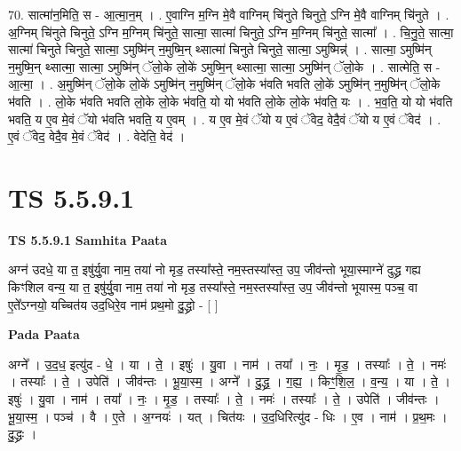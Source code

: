 \documentclass[17pt]{extarticle}
\begin{document}
70. सात्मा॑न॒मिति॒ स - आ॒त्मा॒न॒म् । . ए॒वाग्नि म॒ग्नि मे॒वै वाग्निम् चि॑नुते चिनुते॒ ऽग्नि मे॒वै वाग्निम् चि॑नुते । . अ॒ग्निम् चि॑नुते चिनुते॒ ऽग्नि म॒ग्निम् चि॑नुते॒ सात्मा॒ सात्मा॑ चिनुते॒ ऽग्नि म॒ग्निम् चि॑नुते॒ सात्मा᳚ । . चि॒नु॒ते॒ सात्मा॒ सात्मा॑ चिनुते चिनुते॒ सात्मा॒ ऽमुष्मि॑न् न॒मुष्मि॒न् थ्सात्मा॑ चिनुते चिनुते॒ सात्मा॒ ऽमुष्मिन्न्॑ । . सात्मा॒ ऽमुष्मि॑न् न॒मुष्मि॒न् थ्सात्मा॒ सात्मा॒ ऽमुष्मि॑न् ॅलो॒के लो॒के॑ ऽमुष्मि॒न् थ्सात्मा॒ सात्मा॒ ऽमुष्मि॑न् ॅलो॒के । . सात्मेति॒ स - आ॒त्मा॒ । . अ॒मुष्मि॑न् ॅलो॒के लो॒के॑ ऽमुष्मि॑न् न॒मुष्मि॑न् ॅलो॒के भ॑वति भवति लो॒के॑ ऽमुष्मि॑न् न॒मुष्मि॑न् ॅलो॒के भ॑वति । . लो॒के भ॑वति भवति लो॒के लो॒के भ॑वति॒ यो यो भ॑वति लो॒के लो॒के भ॑वति॒ यः । . भ॒व॒ति॒ यो यो भ॑वति भवति॒ य ए॒व मे॒वं ॅयो भ॑वति भवति॒ य ए॒वम् । . य ए॒व मे॒वं ॅयो य ए॒वं ॅवेद॒ वेदै॒वं ॅयो य ए॒वं ॅवेद॑ । . ए॒वं ॅवेद॒ वेदै॒व मे॒वं ॅवेद॑ । . वेदेति॒ वेद॑ । \newline
\pagebreak
{}

\section{ TS 5.5.9.1 }

\textbf{TS 5.5.9.1 } \newline
\textbf{Samhita Paata} \newline

अग्न॑ उदधे॒ या त॒ इषु॑र्यु॒वा नाम॒ तया॑ नो मृड॒ तस्या᳚स्ते॒ नम॒स्तस्या᳚स्त॒ उप॒ जीव॑न्तो भूया॒स्माग्ने॑ दुद्ध्र गह्य किꣳशिल वन्य॒ या त॒ इषु॑र्यु॒वा नाम॒ तया॑ नो मृड॒ तस्या᳚स्ते॒ नम॒स्तस्या᳚स्त॒ उप॒ जीव॑न्तो भूयास्म॒ पञ्च॒ वा ए॒ते᳚ऽग्नयो॒ यच्चित॑य उद॒धिरे॒व नाम॑ प्रथ॒मो दु॒द्ध्रो - [  ] \newline

\textbf{Pada Paata} \newline

अग्ने᳚ । उ॒द॒ध॒ इत्यु॑द - धे॒ । या । ते॒ । इषुः॑ । यु॒वा । नाम॑ । तया᳚ । नः॒ । मृ॒ड॒ । तस्याः᳚ । ते॒ । नमः॑ । तस्याः᳚ । ते॒ । उपेति॑ । जीव॑न्तः । भू॒या॒स्म॒ । अग्ने᳚ । दु॒द्ध्र॒ । ग॒ह्य॒ । किꣳ॒॒शि॒ल॒ । व॒न्य॒ । या । ते॒ । इषुः॑ । यु॒वा । नाम॑ । तया᳚ । नः॒ । मृ॒ड॒ । तस्याः᳚ । ते॒ । नमः॑ । तस्याः᳚ । ते॒ । उपेति॑ । जीव॑न्तः । भू॒या॒स्म॒ । पञ्च॑ । वै । ए॒ते । अ॒ग्नयः॑ । यत् । चित॑यः । उ॒द॒धिरित्यु॑द - धिः । ए॒व । नाम॑ । प्र॒थ॒मः । दु॒द्ध्रः ।  \newline
\end{document}
